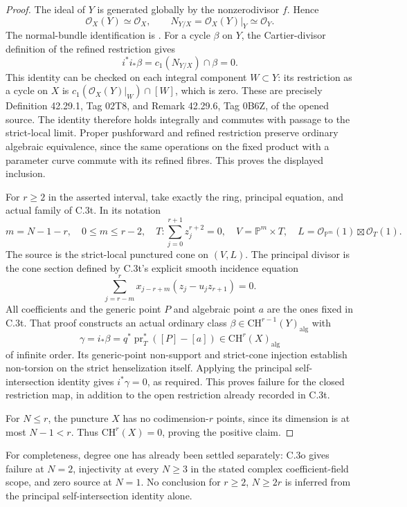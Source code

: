 \begin{proof}
The ideal of $Y$ is generated globally by the
nonzerodivisor $f$. Hence
\[
 \mathcal O_X(Y)\simeq\mathcal O_X,
 \qquad
 N_{Y/X}=\mathcal O_X(Y)|_Y\simeq\mathcal O_Y.
\]
The normal-bundle identification is
\citet[Lemma 31.15.2, Tag 0B3P]{cyStacksPrincipalGysin}.
For a cycle $\beta$ on $Y$, the Cartier-divisor
definition of the refined restriction gives
\[
                    i^*i_*\beta
                  =c_1(N_{Y/X})\cap\beta=0.
\]
This identity can be checked on each integral component
$W\subset Y$: its restriction as a cycle on $X$ is
$c_1(\mathcal O_X(Y)|_W)\cap[W]$, which is zero.
These are precisely Definition 42.29.1, Tag 02T8, and
Remark 42.29.6, Tag 0B6Z, of the opened source.
The identity therefore holds integrally and commutes
with passage to the strict-local limit. Proper
pushforward and refined restriction preserve ordinary
algebraic equivalence, since the same operations on
the fixed product with a parameter curve commute with
its refined fibres. This proves the displayed inclusion.

For $r\ge2$ in the asserted interval, take exactly the
ring, principal equation, and actual family of C.3t.
In its notation
\[
 m=N-1-r,\quad 0\le m\le r-2,\quad
 T:\sum_{j=0}^{r+1}z_j^{r+2}=0,\quad
 V=\mathbb P^m\times T,\quad
 L=\mathcal O_{\mathbb P^m}(1)\boxtimes\mathcal O_T(1).
\]
The source is the strict-local punctured cone on
$(V,L)$. The principal divisor is the cone section
defined by C.3t's explicit smooth incidence equation
\[
 \sum_{j=r-m}^{r}x_{j-r+m}
                 (z_j-u_jz_{r+1})=0.
\]
All coefficients and the generic point $P$ and
algebraic point $a$ are the ones fixed in C.3t.
That proof constructs an actual ordinary class
$\beta\in\mathrm{CH}^{r-1}(Y)_{\mathrm{alg}}$ with
\[
       \gamma=i_*\beta
          =q^*\operatorname{pr}_T^*([P]-[a])
               \in\mathrm{CH}^{r}(X)_{\mathrm{alg}}
\]
of infinite order. Its generic-point non-support and
strict-cone injection establish non-torsion on the
strict henselization itself. Applying the principal
self-intersection identity gives $i^*\gamma=0$,
as required. This proves failure for the closed
restriction map, in addition to the open restriction
already recorded in C.3t.

For $N\le r$, the puncture $X$ has no codimension-$r$
points, since its dimension is at most $N-1<r$.
Thus $\mathrm{CH}^r(X)=0$, proving the positive claim.
\end{proof}

For completeness, degree one has already been settled
separately: C.3o gives failure at $N=2$, injectivity
at every $N\ge3$ in the stated complex coefficient-field
scope, and zero source at $N=1$. No conclusion for
$r\ge2$, $N\ge2r$ is inferred from the principal
self-intersection identity alone.
